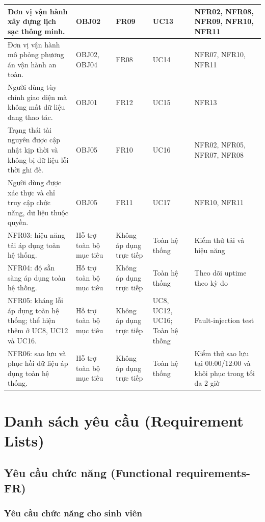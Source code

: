{\begin{longtable}{|>{\raggedright\arraybackslash}p{4.0cm}|>{\raggedright\arraybackslash}p{1.5cm}|>{\raggedright\arraybackslash}p{1.6cm}|>{\raggedright\arraybackslash}p{2.4cm}|>{\raggedright\arraybackslash}p{3.3cm}|}
\hline
Đơn vị vận hành xây dựng lịch sạc thông minh. & OBJ02 & FR09 & UC13 & NFR02, NFR08, NFR09, NFR10, NFR11 \\
\hline
Đơn vị vận hành mô phỏng phương án vận hành an toàn. & OBJ02, OBJ04 & FR08 & UC14 & NFR07, NFR10, NFR11 \\
\hline
Người dùng tùy chỉnh giao diện mà không mất dữ liệu đang thao tác. & OBJ01 & FR12 & UC15 & NFR13 \\
\hline
Trạng thái tài nguyên được cập nhật kịp thời và không bị dữ liệu lỗi thời ghi đè. & OBJ05 & FR10 & UC16 & NFR02, NFR05, NFR07, NFR08 \\
\hline
Người dùng được xác thực và chỉ truy cập chức năng, dữ liệu thuộc quyền. & OBJ05 & FR11 & UC17 & NFR10, NFR11 \\
\hline
NFR03: hiệu năng tải áp dụng toàn hệ thống. & Hỗ trợ toàn bộ mục tiêu & Không áp dụng trực tiếp & Toàn hệ thống & Kiểm thử tải và hiệu năng \\
\hline
NFR04: độ sẵn sàng áp dụng toàn hệ thống. & Hỗ trợ toàn bộ mục tiêu & Không áp dụng trực tiếp & Toàn hệ thống & Theo dõi uptime theo kỳ đo \\
\hline
NFR05: kháng lỗi áp dụng toàn hệ thống; thể hiện thêm ở UC8, UC12 và UC16. & Hỗ trợ toàn bộ mục tiêu & Không áp dụng trực tiếp & UC8, UC12, UC16; Toàn hệ thống & Fault-injection test \\
\hline
NFR06: sao lưu và phục hồi dữ liệu áp dụng toàn hệ thống. & Hỗ trợ toàn bộ mục tiêu & Không áp dụng trực tiếp & Toàn hệ thống & Kiểm thử sao lưu tại 00:00/12:00 và khôi phục trong tối đa 2 giờ \\
\hline
\end{longtable}
}

\section{Danh sách yêu cầu (Requirement Lists)}

\subsection{Yêu cầu chức năng (Functional requirements-FR)}

\subsubsection{Yêu cầu chức năng cho sinh viên}

